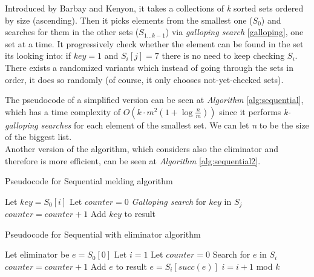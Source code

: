 Introduced by Barbay and Kenyon, it takes a collections of \textit{k} sorted sets ordered by size (ascending). Then it picks elements from the smallest one ($S_0$) and searches for them in the other sets ($S_{1 \ldots k-1}$) via \textit{galloping search} \ref{galloping}, one set at a time. It progressively check whether the element can be found in the set its looking into: if $key=1$ and $S_i[j]=7$ there is no need to keep checking $S_i$.
There exists a randomized variants which instead of going through the sets in order, it does so randomly (of course, it only chooses not-yet-checked sets).

The pseudocode of a simplified version can be seen at \textit{Algorithm} \ref{alg:sequential}, which has a time complexity of $O\left(k \cdot m^2 \left(1+ \log \frac{n}{m}\right)\right)$ since it performs \textit{k-galloping searches} for each element of the smallest set. We can let \textit{n} to be the size of the biggest list.\\
Another version of the algorithm, which considers also the eliminator and therefore is more efficient, can be seen at \textit{Algorithm} \ref{alg:sequential2}.

\begin{algorithm}
    \captionsetup{labelsep=newline}
    \caption{Pseudocode for Sequential melding algorithm \label{alg:sequential}}
    \begin{algorithmic}[1]
            \State Let $key=S_0[i]$
            \State Let $counter=0$
                \State \textit{Galloping search} for $key$ in $S_j$
                    \State $counter = counter+1$
                \EndIf
            \EndFor
                \State Add $key$ to result
            \EndIf
        \EndFor
    \end{algorithmic}
\end{algorithm}

\begin{algorithm}
    \captionsetup{labelsep=newline}
    \caption{Pseudocode for Sequential with eliminator algorithm \label{alg:sequential2}}
    \begin{algorithmic}[1]
        \State Let eliminator be $e=S_0[0]$ 
        \State Let $i=1$
        \State Let $counter=0$
            \State Search for $e$ in $S_i$
                \State $counter=counter+1$
                    \State Add $e$ to result
                \EndIf
            \Else
                \State $e=S_i\left[succ(e)\right]$
            \EndIf
            \State $i=i+1$ mod $k$
        \EndWhile
    \end{algorithmic}
\end{algorithm}

